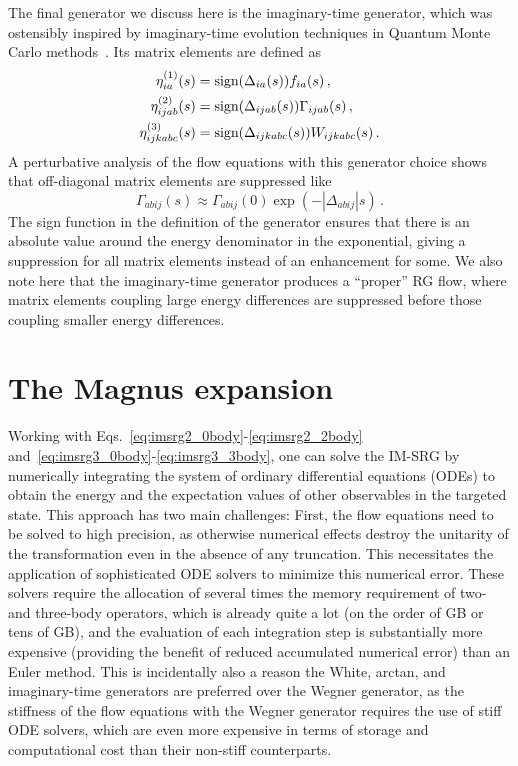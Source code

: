 The final generator we discuss here is the imaginary-time generator,
which was ostensibly inspired by imaginary-time evolution techniques
in Quantum Monte Carlo methods~\cite{Herg15imsrgphysrep}.
Its matrix elements are defined as
\begin{align}
  \eta^{(1)}_{ia}(s) &= \text{sign}(\Delta_{ia}(s))f_{ia}(s)\,, \\
  \eta^{(2)}_{ijab}(s) &= \text{sign}(\Delta_{ijab}(s))\Gamma_{ijab}(s)\,, \\
  \eta^{(3)}_{ijkabc}(s) &= \text{sign}(\Delta_{ijkabc}(s))W_{ijkabc}(s)\,.
\end{align}
A perturbative analysis of the flow equations with this generator choice shows
that off-diagonal matrix elements are suppressed like
\begin{equation}
  \Gamma_{abij}(s) \approx \Gamma_{abij}(0) \exp(-|\Delta_{abij}|s)\,.
\end{equation}
The sign function in the definition of the generator ensures that
there is an absolute value around the energy denominator in the exponential,
giving a suppression for all matrix elements instead of an enhancement for some.
We also note here that the imaginary-time generator produces a ``proper'' RG flow,
where matrix elements coupling large energy differences are suppressed
before those coupling smaller energy differences.

\section{The Magnus expansion}\label{sec:imsrg_magnus}

Working with Eqs.~\ref{eq:imsrg2_0body}-\ref{eq:imsrg2_2body}
and~\ref{eq:imsrg3_0body}-\ref{eq:imsrg3_3body},
one can solve the IM-SRG by numerically integrating
the system of ordinary differential equations (ODEs)
to obtain the energy and the expectation values of other observables in the targeted state.
This approach has two main challenges:
First, the flow equations need to be solved to high precision,
as otherwise numerical effects destroy the unitarity of the transformation
even in the absence of any truncation.
This necessitates the application of sophisticated ODE solvers
to minimize this numerical error.
These solvers require the allocation of several times the memory requirement
of two- and three-body operators,
which is already quite a lot (on the order of GB or tens of GB),
and the evaluation of each integration step is substantially more expensive
(providing the benefit of reduced accumulated numerical error)
than an Euler method.
This is incidentally also a reason the White, arctan, and imaginary-time generators
are preferred over the Wegner generator,
as the stiffness of the flow equations with the Wegner generator
requires the use of stiff ODE solvers,
which are even more expensive in terms of storage and computational cost
than their non-stiff counterparts.

